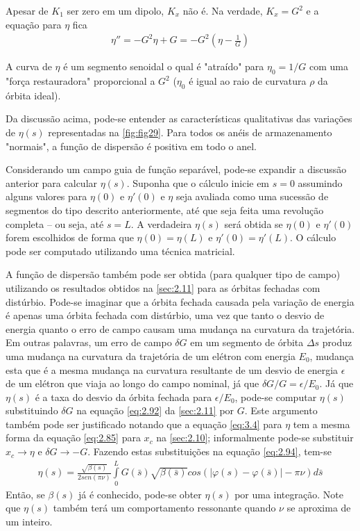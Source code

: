 Apesar de $K_1$ ser zero em um dipolo, $K_x$ não é. Na verdade, $K_x=G^2$ e a equação para $\eta$ fica
\begin{align}
	\eta'' = -G^2\eta + G = -G^2\left(\eta - \frac{1}{G}\right)
\end{align}

A curva de $\eta$ é um segmento senoidal o qual é "atraído" para $\eta_0 = 1/G$ com uma "força restauradora" proporcional a $G^2$ ($\eta_0$ é igual ao raio de curvatura $\rho$ da órbita ideal).

Da discussão acima, pode-se entender as características qualitativas das variações de $\eta(s)$ representadas na \autoref{fig:fig29}. Para todos os anéis de armazenamento "normais", a função de dispersão é positiva em todo o anel.

Considerando um campo guia de função separável, pode-se expandir a discussão anterior para calcular $\eta(s)$. Suponha que o cálculo inicie em $s=0$ assumindo alguns valores para $\eta(0)$ e $\eta'(0)$ e $\eta$ seja avaliada como uma sucessão de segmentos do tipo descrito anteriormente, até que seja feita uma revolução completa --  ou seja, até $s=L$. A verdadeira $\eta(s)$ será obtida se $\eta(0)$ e $\eta'(0)$ forem escolhidos de forma que $\eta(0) = \eta(L)$ e $\eta'(0) = \eta'(L)$. O cálculo pode ser computado utilizando uma técnica matricial.

A função de dispersão também pode ser obtida (para qualquer tipo de campo) utilizando os resultados obtidos na \autoref{sec:2.11} para as órbitas fechadas com distúrbio. Pode-se imaginar que a órbita fechada causada pela variação de energia é apenas uma órbita fechada com distúrbio, uma vez que tanto o desvio de energia quanto o erro de campo causam uma mudança na curvatura da trajetória. Em outras palavras, um erro de campo $\delta G$ em um segmento de órbita $\Delta s$ produz uma mudança na curvatura da trajetória de um elétron com energia $E_0$, mudança esta que é a mesma mudança na curvatura resultante de um desvio de energia $\epsilon$ de um elétron que viaja ao longo do campo nominal, já que $\delta G/G = \epsilon/E_0$. Já que $\eta(s)$ é a taxa do desvio da órbita fechada para $\epsilon/E_0$, pode-se computar $\eta(s)$ substituindo $\delta G$ na equação \eqref{eq:2.92} da \autoref{sec:2.11} por $G$. Este argumento também pode ser justificado notando que a equação \eqref{eq:3.4} para $\eta$ tem a mesma forma da equação \eqref{eq:2.85} para $x_c$ na \autoref{sec:2.10}; informalmente pode-se substituir $x_c \rightarrow \eta$ e $\delta G \rightarrow -G$. Fazendo estas substituições na equação \eqref{eq:2.94}, tem-se
\begin{align}
	\eta(s) = \frac{\sqrt{\beta(s)}}{2sen(\pi\nu)}\int\limits_{0}^{L}G(\bar{s})\sqrt{\beta(\bar{s})}cos(|\varphi(s)-\varphi(\bar{s})|-\pi\nu)d\bar{s}
\end{align}
Então, se $\beta(s)$ já é conhecido, pode-se obter $\eta(s)$ por uma integração. Note que $\eta(s)$ também terá um comportamento ressonante quando $\nu$ se aproxima de um inteiro.

